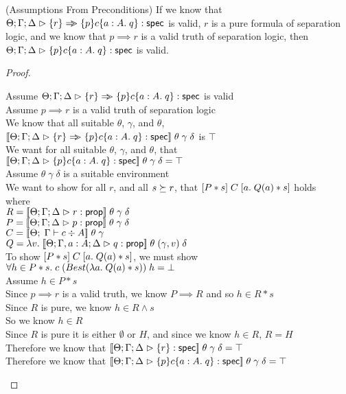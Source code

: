\begin{lemma}{(Assumptions From Preconditions)}
If we know that $\judgeS{\setof{r} \specimp \spec{p}{c}{a:A}{q}}$ is
valid, $r$ is a pure formula of separation logic, and we know that $p
\implies r$ is a valid truth of separation logic, then
$\judgeS{\spec{p}{c}{a:A}{q}}$ is valid.
\end{lemma}

\begin{proof}
  \begin{tabbedproof}
    \oo Assume $\judgeS{\setof{r} \specimp \spec{p}{c}{a:A}{q}}$ is valid \\
    \oo Assume $p \implies r$ is a valid truth of separation logic \\
    \ooo We know that all suitable $\theta$, $\gamma$, and $\theta$, $\interp{\judgeS{\setof{r} \specimp \spec{p}{c}{a:A}{q}}}\;\theta\;\gamma\;\delta$ is $\top$\\
    \ooo We want for all suitable $\theta$, $\gamma$, and $\theta$, that $\interp{\judgeS{\spec{p}{c}{a:A}{q}}}\;\theta\;\gamma\;\delta = \top$ \\
    \ooo Assume $\theta\;\gamma\;\delta$ is a suitable environment \\
    \oooo We want to show for all $r$, and all $s \worldgeq r$, that $\basicspec{P*s}{C}{a}{Q(a) * s}$ holds\\
    \ooox where \\
    \oooox $R = \interp{\judgeA{r}{\assert}}\;\theta\;\gamma\;\delta$ \\
    \oooox $P = \interp{\judgeA{p}{\assert}}\;\theta\;\gamma\;\delta$ \\
    \oooox $C = \interp{\judgeC[\Theta]{\Gamma}{c}{A}}\;\theta\;\gamma$ \\
    \oooox $Q = \semfun{v}{\interp{\judgeA[\Theta; \Gamma, a:A; \Delta]{q}{\assert}}\;\theta\;(\gamma, v)\;\delta}$ \\
    \oooo To show $\basicspec{P*s}{C}{a}{Q(a)*s}$, we must show 
          $\forall h \in P * s.\; c\; (Best(\semfun{a}{Q(a)*s}))\;h = \bot$ \\
    \oooo Assume $h \in P * s$ \\
    \ooooo Since $p \implies r$ is a valid truth, we know $P \implies R$ and so $h \in R * s$ \\
    \ooooo Since $R$ is pure, we know $h \in R \land s$ \\
    \ooooo So we know $h \in R$ \\
    \ooooo Since $R$ is pure it is either $\emptyset$ or $H$, and since we know $h \in R$, $R = H$ \\
    \ooooo Therefore we know that $\interp{\judgeS{\setof{r}}}\;\theta\;\gamma\;\delta = \top$ \\
    \ooooo Therefore we know that $\interp{\judgeS{\spec{p}{c}{a:A}{q}}}\;\theta\;\gamma\;\delta = \top$ \\
  \end{tabbedproof}
\end{proof}

